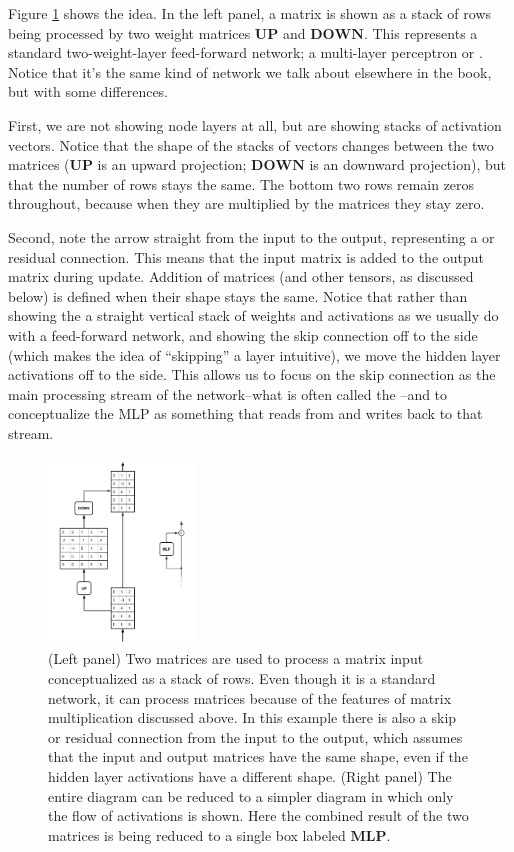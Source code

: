 Figure \ref{flowPerspective} shows the idea. In the left panel, a matrix is shown as a stack of rows being processed by two weight matrices $\mathbf{UP}$ and $\mathbf{DOWN}$. This represents a standard two-weight-layer feed-forward network; a multi-layer perceptron or . Notice that it's the same kind of network we talk about elsewhere in the book, but with some differences.  

First, we are not showing node layers at all, but are showing stacks of activation vectors.  Notice that the shape of the stacks of vectors changes between the two matrices ($\mathbf{UP}$ is an upward projection; $\mathbf{DOWN}$ is an downward projection), but that the number of rows stays the same. The bottom two rows remain zeros throughout, because when they are multiplied by the matrices they stay zero. 

Second, note the arrow straight from the input to the output, representing a   or residual connection. This means that the input matrix is added to the output matrix during update. Addition of matrices (and other tensors, as discussed below) is defined when their shape stays the same. Notice that rather than showing the a straight vertical stack of weights and activations as we usually do with a feed-forward network, and showing the skip connection off to the side (which makes the idea of ``skipping'' a layer intuitive), we move the hidden layer activations off to the side. This allows us to focus on the skip connection as the main processing stream of the network--what is often called the --and to conceptualize the MLP as something that reads from and writes back to that stream.

\begin{figure}[h]
\centering
\includegraphics[width=0.35\textwidth]{images/flowPerspective.png}
\caption[Jeff Yoshimi.]{(Left panel) Two matrices are used to process a matrix input conceptualized as a stack of rows. Even though it is a standard network, it can process matrices because of the features of matrix multiplication discussed above. In this example there is also a skip or residual connection from the input to the output, which assumes that the input and output matrices have the same shape, even if the hidden layer activations have a different shape. (Right panel) The entire diagram can be reduced to a simpler diagram in which only the flow of activations is shown. Here the combined result of the two matrices is being reduced to a single box labeled  $\mathbf{MLP}$. }
\label{flowPerspective}
\end{figure} 

